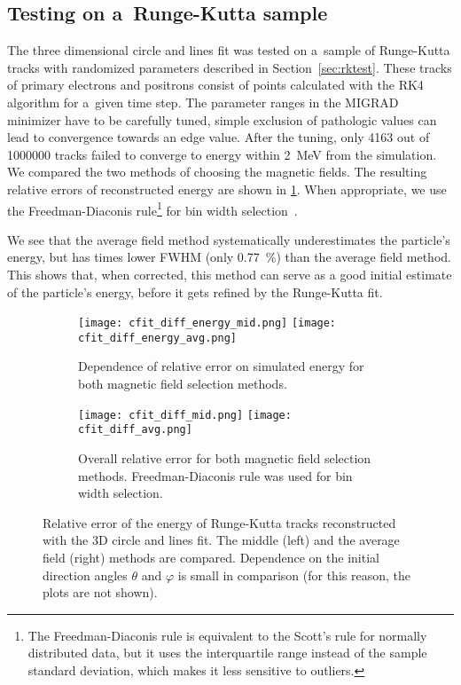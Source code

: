 			\subsection{Testing on a~Runge-Kutta sample}
				The three dimensional circle and lines fit was tested on a~sample of Runge-Kutta tracks with randomized parameters described in Section~\ref{sec:rktest}. These tracks of primary electrons and positrons consist of points calculated with the \ac{RK4} algorithm for a~given time step. The parameter ranges in the MIGRAD minimizer have to be carefully tuned, simple exclusion of pathologic values can lead to convergence towards an edge value. After the tuning, only \num{4163} out of \num{1000000} tracks failed to converge to energy within \qty{2}{\MeV} from the simulation. We compared the two methods of choosing the magnetic fields. The resulting relative errors of reconstructed energy are shown in \cref{fig:cfit_rk}. When appropriate, we use the Freedman-Diaconis rule\footnote{The Freedman-Diaconis rule is equivalent to the Scott's rule for normally distributed data, but it uses the interquartile range instead of the sample standard deviation, which makes it less sensitive to outliers.} for bin width selection~\cite{FreedmanDiac}.

				We see that the average field method systematically underestimates the particle's energy, but has  times lower \acs{FWHM} (only \qty{0.77}{\percent}) than the average field method. This shows that, when corrected, this method can serve as a good initial estimate of the particle's energy, before it gets refined by the Runge-Kutta fit.
				
				\begin{figure}
					\centering
					\begin{subfigure}[t]{\textwidth}
						\centering
						\texttt{[image: cfit\_diff\_energy\_mid.png]}
						\hfill
						\texttt{[image: cfit\_diff\_energy\_avg.png]}
						\caption{Dependence of relative error on simulated energy for both magnetic field selection methods.}
					\end{subfigure}
					\begin{subfigure}[t]{\textwidth}
						\centering
						\texttt{[image: cfit\_diff\_mid.png]}
						\hfill
						\texttt{[image: cfit\_diff\_avg.png]}
						\caption{Overall relative error for both magnetic field selection methods. Freedman-Diaconis rule was used for bin width selection.}
					\end{subfigure}
					\caption{Relative error of the energy of Runge-Kutta tracks reconstructed with the 3D circle and lines fit. The middle (left) and the average field (right) methods are compared. Dependence on the initial direction angles $\theta$ and $\varphi$ is small in comparison (for this reason, the plots are not shown).}
					\label{fig:cfit_rk}
				\end{figure}
	
